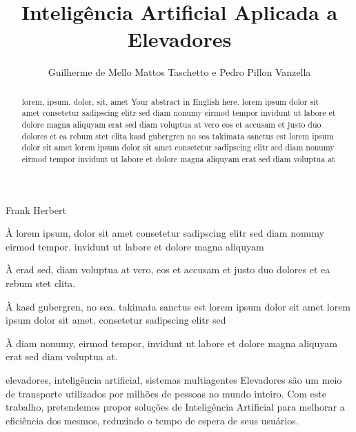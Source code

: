 \documentclass[portuguese,oneside]{tcc}
\author{Guilherme de Mello Mattos Taschetto e Pedro Pillon Vanzella}
\title{Inteligência Artificial Aplicada a Elevadores}
      {Artificial Intelligence Applied to Elevators}
\begin{document}
         {Frank Herbert}

\begin{agradecimentos}
À lorem ipsum, dolor sit amet consetetur sadipscing elitr sed diam
nonumy eirmod tempor. invidunt ut labore et dolore magna aliquyam

À erad sed, diam voluptua at vero, eos et accusam et justo duo
dolores et ea rebum stet clita.

À kasd gubergren, no sea. takimata sanctus est lorem ipsum dolor sit
amet lorem ipsum dolor sit amet. consetetur sadipscing elitr sed

À diam nonumy, eirmod tempor, invidunt ut labore et dolore magna
aliquyam erat sed diam voluptua at.
\end{agradecimentos}

\begin{resumo}{elevadores, inteligência artificial, sistemas multiagentes}
  Elevadores são um meio de transporte utilizados por milhões de pessoas no
  mundo inteiro. Com este trabalho, pretendemos propor soluções de Inteligência
  Artificial para melhorar a eficiência dos mesmos, reduzindo o tempo de espera
  de seus usuários.
\end{resumo}

\begin{abstract}{lorem, ipsum, dolor, sit, amet}
Your abstract in English here. lorem ipsum dolor sit amet
consetetur sadipscing elitr sed diam nonumy eirmod tempor invidunt
ut labore et dolore magna aliquyam erat sed diam voluptua at vero
eos et accusam et justo duo dolores et ea rebum stet clita kasd
gubergren no sea takimata sanctus est lorem ipsum dolor sit amet
lorem ipsum dolor sit amet consetetur sadipscing elitr sed diam
nonumy eirmod tempor invidunt ut labore et dolore magna aliquyam
erat sed diam voluptua at
\end{abstract}

\tableofcontents












\end{document}

